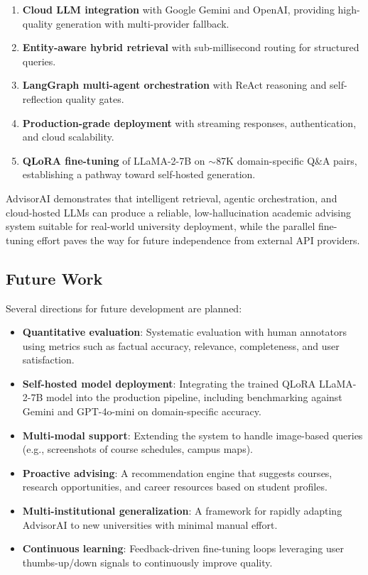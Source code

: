 \documentclass[conference,compsoc]{IEEEtran}
\begin{document}
\begin{enumerate}
    \item \textbf{Cloud LLM integration} with Google Gemini and OpenAI, providing high-quality generation with multi-provider fallback.
    \item \textbf{Entity-aware hybrid retrieval} with sub-millisecond routing for structured queries.
    \item \textbf{LangGraph multi-agent orchestration} with ReAct reasoning and self-reflection quality gates.
    \item \textbf{Production-grade deployment} with streaming responses, authentication, and cloud scalability.
    \item \textbf{QLoRA fine-tuning} of LLaMA-2-7B on ${\sim}$87K domain-specific Q\&A pairs, establishing a pathway toward self-hosted generation.
\end{enumerate}

AdvisorAI demonstrates that intelligent retrieval, agentic orchestration, and cloud-hosted LLMs can produce a reliable, low-hallucination academic advising system suitable for real-world university deployment, while the parallel fine-tuning effort paves the way for future independence from external API providers.

\subsection{Future Work}

Several directions for future development are planned:

\begin{itemize}
    \item \textbf{Quantitative evaluation}: Systematic evaluation with human annotators using metrics such as factual accuracy, relevance, completeness, and user satisfaction.
    \item \textbf{Self-hosted model deployment}: Integrating the trained QLoRA LLaMA-2-7B model into the production pipeline, including benchmarking against Gemini and GPT-4o-mini on domain-specific accuracy.
    \item \textbf{Multi-modal support}: Extending the system to handle image-based queries (e.g., screenshots of course schedules, campus maps).
    \item \textbf{Proactive advising}: A recommendation engine that suggests courses, research opportunities, and career resources based on student profiles.
    \item \textbf{Multi-institutional generalization}: A framework for rapidly adapting AdvisorAI to new universities with minimal manual effort.
    \item \textbf{Continuous learning}: Feedback-driven fine-tuning loops leveraging user thumbs-up/down signals to continuously improve quality.
\end{itemize}
\end{document}
